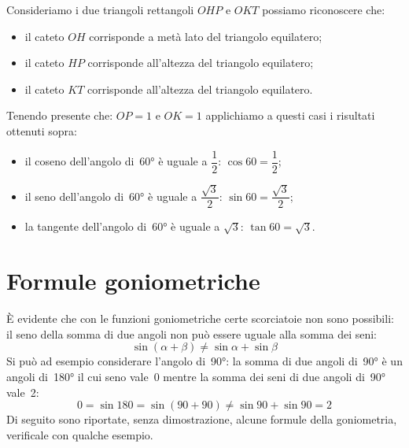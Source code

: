  \begin{minipage}{.45\textwidth}
  \begin{center}
\begin{inaccessibleblock}
    
\end{inaccessibleblock}
  \end{center}
 \end{minipage}
 \begin{minipage}{.45\textwidth}
Consideriamo i due triangoli rettangoli \(OHP\) e \(OKT\) possiamo riconoscere 
che:
\begin{itemize} [noitemsep]
 \item il cateto \(OH\) corrisponde a metà lato del triangolo equilatero; 
 \item il cateto \(HP\) corrisponde all'altezza del triangolo equilatero;
 \item il cateto \(KT\) corrisponde all'altezza del triangolo equilatero.\\
\end{itemize}
 \end{minipage}


Tenendo presente che: \(OP=1\) e \(OK=1\) applichiamo a questi casi i risultati 
ottenuti sopra:
\begin{itemize} [noitemsep]
 \item il coseno dell'angolo di~60° è uguale a \(\dfrac{1}{2}\): 
  \(\cos 60 = \dfrac{1}{2}\); 
 \item il seno dell'angolo di~60° è uguale a \(\dfrac{\sqrt{3}}{2}\): 
  \(\sin 60 = \dfrac{\sqrt{3}}{2}\); 
 \item la tangente dell'angolo di~60° è uguale a \(\sqrt{3}\): 
  \(\tan 60 = \sqrt{3}\).
\end{itemize}


\section{Formule goniometriche}
\label{sec:gonio_formule}

È evidente che con le funzioni goniometriche certe scorciatoie non sono 
possibili: il seno della somma di due angoli non può essere uguale alla 
somma dei seni:
\vspace{-6pt}
\[\sin \left( \alpha + \beta \right) \ne \sin \alpha + \sin \beta\]
Si può ad esempio considerare l'angolo di~90°: la somma di due angoli di~90° 
è un angoli di~180° il cui seno vale~0 mentre la somma dei seni di  due 
angoli 
di~90° vale~2:
\vspace{-6pt}
\[0 = \sin 180 = \sin \left( 90 + 90 \right) \ne \sin 90 + \sin 90 = 2 \]
Di seguito sono riportate, senza dimostrazione, alcune formule della 
goniometria, verificale con qualche esempio.
\vspace{-6pt}

